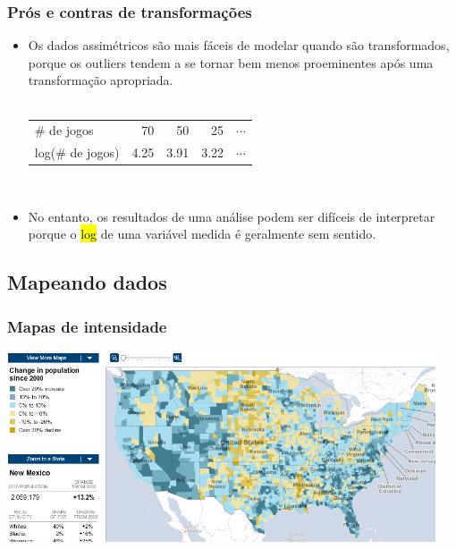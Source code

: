 \begin{frame}
\frametitle{Prós e contras de transformações}

\begin{itemize}
\justifying
\item Os dados assimétricos são mais fáceis de modelar quando são transformados, porque os outliers tendem a se tornar bem menos proeminentes após uma transformação apropriada. \\
$\:$ \\
\renewcommand{\arraystretch}{1.5}
\begin{tabular}{l r r r r }
\# de jogos		&  70 	& 50 		& 25 		 		& $\cdots$ \\
log(\# de jogos)	& 4.25	& 3.91 	& 3.22 	 	& $\cdots$
\end{tabular}

$\:$ \\
\justifying
\item No entanto, os resultados de uma análise podem ser difíceis de interpretar porque o \hl{log} de uma variável medida é geralmente sem sentido.

\end{itemize}

\pause
\justifying
\small{

}
\end{frame}


\subsection{Mapeando dados}


\begin{frame}
\frametitle{Mapas de intensidade}
\justifying
{}

\begin{center}
\includegraphics[width=0.95\textwidth]{1-6_numerical_data/change_in_pop_intensity.png}
\end{center}


\end{frame}




